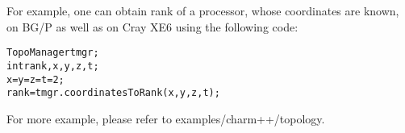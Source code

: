 \noindent For example, one can obtain rank of a processor, whose coordinates are known, on 
BG/P as well as on Cray XE6 using the following code:

\begin{alltt}
TopoManager tmgr;
int rank,x,y,z,t;
x = y = z = t = 2;
rank = tmgr.coordinatesToRank(x,y,z,t);
\end{alltt}

\noindent For more example, please refer to examples/charm++/topology.



